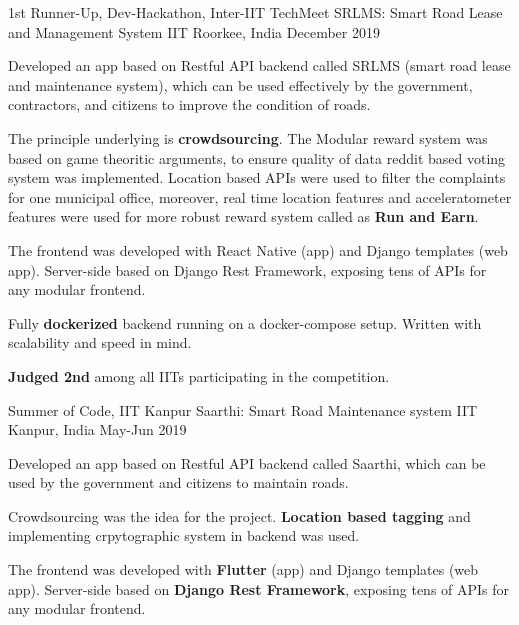 \begin{cventries}
\cventry
    {1st Runner-Up, Dev-Hackathon, Inter-IIT TechMeet} %
    {SRLMS: Smart Road Lease and Management System} %
    {IIT Roorkee, India} %
    {December 2019} %
    {
      \begin{cvitems} %
        \item {Developed an app based on Restful API backend called SRLMS (smart road lease and maintenance system), which can be used effectively by the government, contractors, and citizens to improve the condition of roads.}
        \item {The principle underlying is \textbf{crowdsourcing}. The Modular reward system was based on game theoritic arguments, to ensure quality of data reddit based voting system was implemented. Location based APIs were used to filter the complaints for one municipal office, moreover, real time location features and acceleratometer features were used for more robust reward system called as \textbf{Run and Earn}.}        
        \item {The frontend was developed with React Native (app) and Django templates (web app). Server-side based on Django Rest Framework, exposing tens of APIs for any modular frontend.}        
        \item {Fully \textbf{dockerized} backend running on a docker-compose setup. Written with scalability and speed in mind.}
        \item {\textbf{Judged 2nd} among all IITs participating in the competition.}
      \end{cvitems}
    }
    
\cventry
    {Summer of Code, IIT Kanpur} %
    {Saarthi: Smart Road Maintenance system} %
    {IIT Kanpur, India} %
    {May-Jun 2019} %
    {
      \begin{cvitems} %
        \item {Developed an app based on Restful API backend called Saarthi, which can be used by the government and citizens to maintain roads.}
        \item {Crowdsourcing was the idea for the project. \textbf{Location based tagging} and implementing crpytographic system in backend was used.}
        \item {The frontend was developed with \textbf{Flutter} (app) and Django templates (web app). Server-side based on \textbf{Django Rest Framework}, exposing tens of APIs for any modular frontend.}
      \end{cvitems}
    }


\end{cventries}
